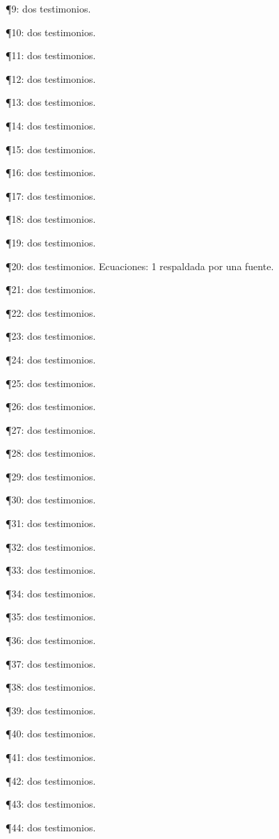 \documentclass{book}
\begin{document}
\noindent ¶9: dos testimonios.

\noindent ¶10: dos testimonios.

\noindent ¶11: dos testimonios.

\noindent ¶12: dos testimonios.

\noindent ¶13: dos testimonios.

\noindent ¶14: dos testimonios.

\noindent ¶15: dos testimonios.

\noindent ¶16: dos testimonios.

\noindent ¶17: dos testimonios.

\noindent ¶18: dos testimonios.

\noindent ¶19: dos testimonios.

\noindent ¶20: dos testimonios. Ecuaciones: 1 respaldada por una fuente.

\noindent ¶21: dos testimonios.

\noindent ¶22: dos testimonios.

\noindent ¶23: dos testimonios.

\noindent ¶24: dos testimonios.

\noindent ¶25: dos testimonios.

\noindent ¶26: dos testimonios.

\noindent ¶27: dos testimonios.

\noindent ¶28: dos testimonios.

\noindent ¶29: dos testimonios.

\noindent ¶30: dos testimonios.

\noindent ¶31: dos testimonios.

\noindent ¶32: dos testimonios.

\noindent ¶33: dos testimonios.

\noindent ¶34: dos testimonios.

\noindent ¶35: dos testimonios.

\noindent ¶36: dos testimonios.

\noindent ¶37: dos testimonios.

\noindent ¶38: dos testimonios.

\noindent ¶39: dos testimonios.

\noindent ¶40: dos testimonios.

\noindent ¶41: dos testimonios.

\noindent ¶42: dos testimonios.

\noindent ¶43: dos testimonios.

\noindent ¶44: dos testimonios.
\end{document}
